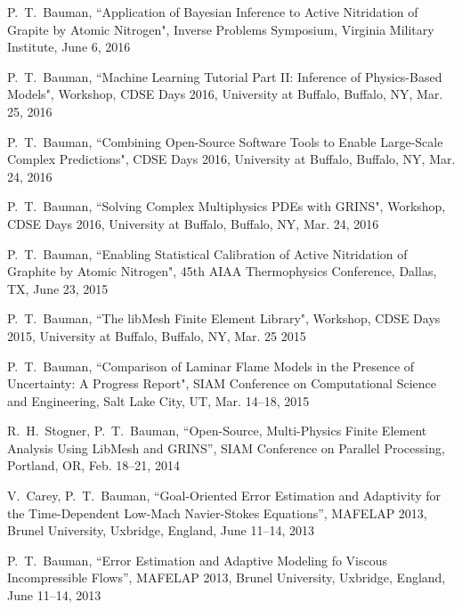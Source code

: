 P.~T.~Bauman,
``Application of Bayesian Inference to Active Nitridation of Grapite by Atomic Nitrogen",
Inverse Problems Symposium, Virginia Military Institute, June 6, 2016

\blankline

P.~T.~Bauman,
``Machine Learning Tutorial Part II: Inference of Physics-Based Models",
Workshop, CDSE Days 2016, University at Buffalo, Buffalo, NY, Mar. 25, 2016

\blankline

P.~T.~Bauman,
``Combining Open-Source Software Tools to Enable Large-Scale Complex Predictions",
CDSE Days 2016, University at Buffalo, Buffalo, NY, Mar. 24, 2016

\blankline

P.~T.~Bauman,
``Solving Complex Multiphysics PDEs with GRINS",
Workshop, CDSE Days 2016, University at Buffalo, Buffalo, NY, Mar. 24, 2016

\blankline

P.~T.~Bauman,
``Enabling Statistical Calibration of Active Nitridation of Graphite by Atomic Nitrogen",
45th AIAA Thermophysics Conference, Dallas, TX, June 23, 2015

\blankline

P.~T.~Bauman,
``The libMesh Finite Element Library",
Workshop, CDSE Days 2015, University at Buffalo, Buffalo, NY, Mar. 25 2015

\blankline

P.~T.~Bauman,
``Comparison of Laminar Flame Models in the Presence of Uncertainty: A Progress Report",
SIAM Conference on Computational Science and Engineering, Salt Lake City, UT, Mar. 14--18, 2015

\blankline

R.~H.~Stogner, P.~T.~Bauman,
``Open-Source, Multi-Physics Finite Element Analysis Using LibMesh and GRINS'',
SIAM Conference on Parallel Processing, Portland, OR, Feb. 18--21, 2014

\blankline

V.~Carey, P.~T.~Bauman,
``Goal-Oriented Error Estimation and Adaptivity for the Time-Dependent Low-Mach Navier-Stokes Equations'',
MAFELAP 2013, Brunel University, Uxbridge, England, June 11--14, 2013

\blankline

P.~T.~Bauman,
``Error Estimation and Adaptive Modeling fo Viscous Incompressible Flows'',
MAFELAP 2013, Brunel University, Uxbridge, England, June 11--14, 2013

\blankline

